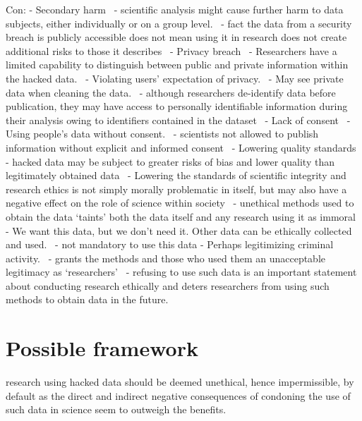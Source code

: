 Con:
- Secondary harm~\parencite[][746]{nature}
  - scientific analysis might cause further harm to data subjects, either individually or on a group level.~\parencite[][746]{nature}
  - fact the data from a security breach is publicly accessible does not mean using it in research does not create additional risks to those it describes~\parencite[][23]{acm}
- Privacy breach~\parencite[][746]{nature}
  - Researchers have a limited capability to distinguish between public and private information within the hacked data.~\parencite[][5]{patreon}
  - Violating users’ expectation of privacy.~\parencite[][5]{patreon}
  - May see private data when cleaning the data.~\parencite[][5]{patreon}
  - although researchers de-identify data before publication, they may have access to personally identifiable information during their analysis owing to identifiers contained in the dataset~\parencite[][746]{nature}
- Lack of consent~\parencite[][746]{nature}
  - Using people’s data without consent.~\parencite[][5]{patreon}
  - scientists not allowed to publish information without explicit and informed consent~\parencite[][745]{nature}
- Lowering quality standards~\parencite[][746]{nature}
  - hacked data may be subject to greater risks of bias and lower quality than legitimately obtained data~\parencite[][746]{nature}
  - Lowering the standards of scientific integrity and research ethics is not simply morally problematic in itself, but may also have a negative effect on the role of science within society~\parencite[][746]{nature}
  - unethical methods used to obtain the data ‘taints’ both the data itself and any research using it as immoral~\parencite[][24]{acm}
- We want this data, but we don’t need it. Other data can be ethically collected and used.~\parencite[][5]{patreon}
  - not mandatory to use this data
- Perhaps legitimizing criminal activity.~\parencite[][5]{patreon}
  - grants the methods and those who used them an unacceptable legitimacy as ‘researchers’~\parencite[][24]{acm}
  - refusing to use such data is an important statement about conducting research ethically and deters researchers from using such methods to obtain data in the future.~\parencite[][24]{acm}

\section*{Possible framework}

research using hacked data should
be deemed unethical, hence impermissible, by default as the direct
and indirect negative consequences of condoning the use of such
data in science seem to outweigh the benefits.~\parencite[][747]{nature}

